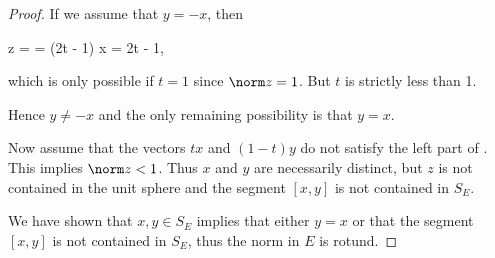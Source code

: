 \begin{proof}
  If we assume that \( y = -x \), then
  \begin{balign*}
    \norm z
    =
    =
    (2t - 1) \norm x
    =
    2t - 1,
  \end{balign*}
  which is only possible if \( t = 1 \) since \( \norm z = 1 \). But \( t \) is strictly less than 1.

  Hence \( y \neq -x \) and the only remaining possibility is that \( y = x \).

  Now assume that the vectors \( tx \) and \( (1-t)y \) do not satisfy the left part of . This implies \( \norm z < 1 \). Thus \( x \) and \( y \) are necessarily distinct, but \( z \) is not contained in the unit sphere and the segment \( [x, y] \) is not contained in \( S_E \).

  We have shown that \( x, y \in S_E \) implies that either \( y = x \) or that the segment \( [x, y] \) is not contained in \( S_E \), thus the norm in \( E \) is rotund.
\end{proof}

